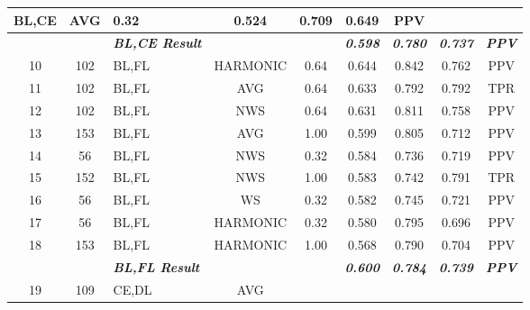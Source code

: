 \begin{table}[H]
{\begin{tabular}{cc|l|cc|c|c|c|c|}
      BL,CE &
      \multicolumn{1}{c|}{AVG} &
      0.32 &
      0.524 &
      0.709 &
      0.649 &
      PPV \\ \hline
     &
       &
      \textit{\textbf{BL,CE Result}} &
       &
       &
      \textit{\textbf{0.598}} &
      \textit{\textbf{0.780}} &
      \textit{\textbf{0.737}} &
      \textit{\textbf{PPV}} \\ \hline
    \multicolumn{1}{|c|}{10} &
      102 &
      BL,FL &
      \multicolumn{1}{c|}{HARMONIC} &
      0.64 &
      0.644 &
      0.842 &
      0.762 &
      PPV \\ \hline
    \multicolumn{1}{|c|}{11} &
      102 &
      BL,FL &
      \multicolumn{1}{c|}{AVG} &
      0.64 &
      0.633 &
      0.792 &
      0.792 &
      TPR \\ \hline
    \multicolumn{1}{|c|}{12} &
      102 &
      BL,FL &
      \multicolumn{1}{c|}{NWS} &
      0.64 &
      0.631 &
      0.811 &
      0.758 &
      PPV \\ \hline
    \multicolumn{1}{|c|}{13} &
      153 &
      BL,FL &
      \multicolumn{1}{c|}{AVG} &
      1.00 &
      0.599 &
      0.805 &
      0.712 &
      PPV \\ \hline
    \multicolumn{1}{|c|}{14} &
      56 &
      BL,FL &
      \multicolumn{1}{c|}{NWS} &
      0.32 &
      0.584 &
      0.736 &
      0.719 &
      PPV \\ \hline
    \multicolumn{1}{|c|}{15} &
      152 &
      BL,FL &
      \multicolumn{1}{c|}{NWS} &
      1.00 &
      0.583 &
      0.742 &
      0.791 &
      TPR \\ \hline
    \multicolumn{1}{|c|}{16} &
      56 &
      BL,FL &
      \multicolumn{1}{c|}{WS} &
      0.32 &
      0.582 &
      0.745 &
      0.721 &
      PPV \\ \hline
    \multicolumn{1}{|c|}{17} &
      56 &
      BL,FL &
      \multicolumn{1}{c|}{HARMONIC} &
      0.32 &
      0.580 &
      0.795 &
      0.696 &
      PPV \\ \hline
    \multicolumn{1}{|c|}{18} &
      153 &
      BL,FL &
      \multicolumn{1}{c|}{HARMONIC} &
      1.00 &
      0.568 &
      0.790 &
      0.704 &
      PPV \\ \hline
     &
       &
      \textit{\textbf{BL,FL Result}} &
       &
       &
      \textit{\textbf{0.600}} &
      \textit{\textbf{0.784}} &
      \textit{\textbf{0.739}} &
      \textit{\textbf{PPV}} \\ \hline
    \multicolumn{1}{|c|}{19} &
      109 &
      CE,DL &
      \multicolumn{1}{c|}{AVG} &

\end{tabular}}
\end{table}
